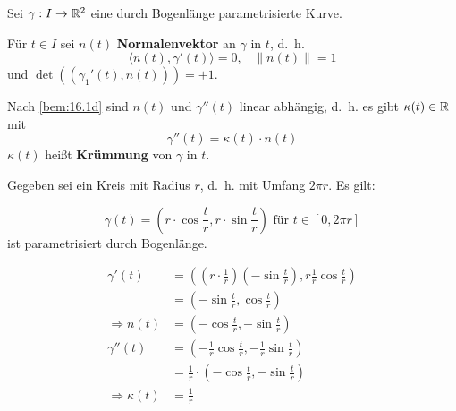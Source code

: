 \begin{definition}%
    Sei $\gamma: I \rightarrow \mathbb{R}^2$ eine durch Bogenlänge
    parametrisierte Kurve.

    \begin{defenum}
        \item Für $t \in I$ sei $n(t)$ \textbf{Normalenvektor}
              an $\gamma$ in $t$, d.~h.
              \[\langle n(t), \gamma'(t) \rangle = 0, \;\;\; \|n(t)\|=1 \]
              und $\det((\gamma_1'(t), n(t))) = +1$.
        \item Nach \cref{bem:16.1d} sind $n(t)$ und $\gamma''(t)$ linear
              abhängig, d.~h. es gibt $\kappa(t) \in \mathbb{R}$ mit
              \[\gamma''(t) = \kappa(t) \cdot n(t)\]
              $\kappa(t)$ heißt \textbf{Krümmung}
              von $\gamma$ in $t$.
    \end{defenum}
\end{definition}

\begin{beispiel}%
    Gegeben sei ein Kreis mit Radius $r$, d.~h. mit Umfang $2\pi r$.
    Es gilt:

    \[\gamma(t) = \left (r \cdot \cos \frac{t}{r}, r \cdot \sin \frac{t}{r} \right ) \text{ für } t \in [0, 2\pi r]\]
    ist parametrisiert durch Bogenlänge.

    \begin{align*}
        \gamma'(t)  &= \left ((r \cdot \frac{1}{r}) (- \sin \frac{t}{r}), r \frac{1}{r} \cos \frac{t}{r} \right )\\
                    &= \left (- \sin \frac{t}{r}, \cos \frac{t}{r} \right )\\
        \Rightarrow n(t) &= \left (- \cos \frac{t}{r}, - \sin \frac{t}{r} \right )\\
        \gamma''(t) &= \left (- \frac{1}{r} \cos \frac{t}{r}, - \frac{1}{r} \sin \frac{t}{r} \right )\\
                    &= \frac{1}{r} \cdot \left (- \cos \frac{t}{r}, - \sin \frac{t}{r} \right )\\
        \Rightarrow \kappa(t) &= \frac{1}{r}
    \end{align*}
\end{beispiel}

